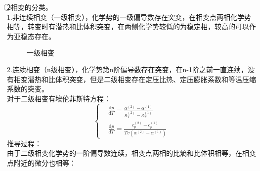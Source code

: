 \documentclass[12pt]{article}
\begin{document}
\noindent
\textcircled{2}相变的分类。\\
1.非连续相变（一级相变），化学势的一级偏导数存在突变，在相变点两相化学势相等，转变时有潜热和比体积突变，在两侧化学势较低的为稳定相，较高的可以作为亚稳态存在。\\
\begin{figure}[H]
	\centering
	\quad\quad\quad
	\caption{一级相变}
\end{figure}
\noindent
2.连续相变（n级相变），化学势第n阶偏导数存在突变，在n-1阶之前一直连续，没有相变潜热和比体积突变，但是二级相变存在定压比热、定压膨胀系数和等温压缩系数的突变。\\
对于二级相变有埃伦菲斯特方程：
\begin{equation}
	\left\{\begin{split}
		&\frac{\mathrm{d}p}{\mathrm{d}T}=\frac{\alpha^{(2)}-\alpha^{(1)}}{\kappa_T^{(2)}-\kappa_T^{(1)}}\\
		&\frac{\mathrm{d}p}{\mathrm{d}T}=\frac{c_p^{(2)}-c_p^{(1)}}{Tv(\alpha^{(2)}-\alpha^{(1)})}
		\end{split}
	\right.
\end{equation}
推导过程：\\
由于二级相变化学势的一阶偏导数连续，相变点两相的比熵和比体积相等，在相变点附近的微分也相等：
\end{document}
